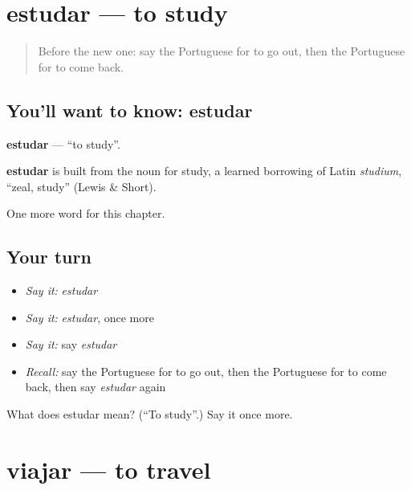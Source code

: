 \section[estudar]{estudar — to study}

\label{lesson:PT-C55-estudar}



\begin{quote}
Before the new one: say the Portuguese for to go out, then the Portuguese for to come back.
\end{quote}

\subsection*{You'll want to know: estudar}
\textbf{estudar} — \textquotedblleft{}to study\textquotedblright{}.

\begin{cousinweb}
\textbf{estudar} is built from the noun for study, a learned borrowing of Latin \emph{studium}, \textquotedblleft{}zeal, study\textquotedblright{} (Lewis \& Short).
\end{cousinweb}

\begin{grammarlens}[title={What you've built}]
One more word for this chapter.
\end{grammarlens}

\subsection*{Your turn}
\begin{itemize}
\raggedright
  \item \emph{Say it:} \emph{estudar}
  \item \emph{Say it:} \emph{estudar}, once more
  \item \emph{Say it:} say \emph{estudar}
  \item \emph{Recall:} say the Portuguese for to go out, then the Portuguese for to come back, then say \emph{estudar} again
\end{itemize}

\begin{tcolorbox}[breakable,colback=teal!4,colframe=teal!35!black,title={Before you move on}]
What does estudar mean? (\textquotedblleft{}To study\textquotedblright{}.) Say it once more.
\end{tcolorbox}
\section[viajar]{viajar — to travel}

